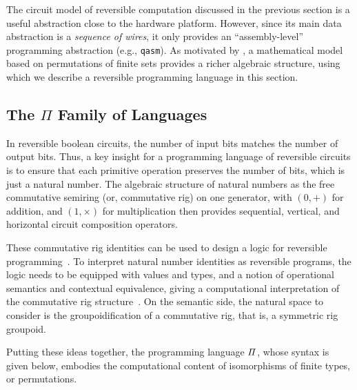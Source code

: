 The circuit model of reversible computation discussed in the previous section is a useful abstraction close to the
hardware platform. However, since its main data abstraction is a \emph{sequence of wires}, it only provides an
``assembly-level'' programming abstraction (e.g., \verb|qasm|). As motivated by \citet{LAFONT2003257}, a mathematical
model based on permutations of finite sets provides a richer algebraic structure, using which we describe a reversible
programming language in this section.

\subsection{The $\Pi$ Family of Languages}
\label{sec:langRev-examples}
\label{examples}

In reversible boolean circuits, the number of input bits matches the number of output bits. Thus, a key insight for a
programming language of reversible circuits is to ensure that each primitive operation preserves the number of bits,
which is just a natural number. The algebraic structure of natural numbers as the free commutative semiring (or,
commutative rig) on one generator, with $(0,+)$ for addition, and $(1,\times)$ for multiplication then provides
sequential, vertical, and horizontal circuit composition operators.

These commutative rig identities can be used to design a logic for reversible
programming~\cite*{sparksSuperstructuralReversibleLogic2014}. To interpret natural number identities as reversible programs,
the logic needs to be equipped with values and types, and a notion of operational semantics and contextual equivalence,
giving a computational interpretation of the commutative rig structure~\cite{jamesInformationEffects2012}. On the
semantic side, the natural space to consider is the groupoidification of a commutative rig, that is, a symmetric rig
groupoid.

Putting these ideas together, the programming language $\mathit{\Pi}$, whose syntax is given below, embodies the
computational content of isomorphisms of finite types, or permutations.


